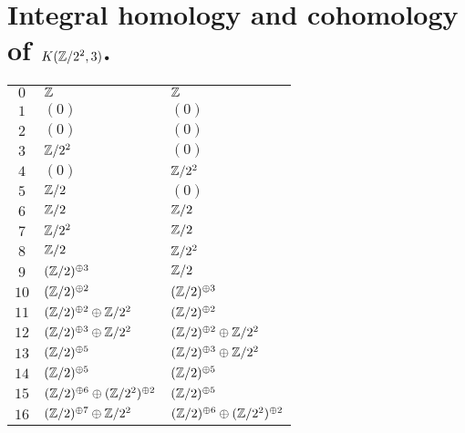\section{Integral homology and cohomology of $K(\mathbb{Z}/2^{2},3)$.}
\tablelasttail{\hline}
\begin{supertabular}{|c|p{5.5cm}|p{5.5cm}|}
$0$%
&$\mathbb{Z}$%
&$\mathbb{Z}$\\

$1$%
&$(0)$%
&$(0)$\\

$2$%
&$(0)$%
&$(0)$\\

$3$%
&$\mathbb{Z}/2^{2}$%
&$(0)$\\

$4$%
&$(0)$%
&$\mathbb{Z}/2^{2}$\\

$5$%
&$\mathbb{Z}/2$%
&$(0)$\\

$6$%
&$\mathbb{Z}/2$%
&$\mathbb{Z}/2$\\

$7$%
&$\mathbb{Z}/2^{2}$%
&$\mathbb{Z}/2$\\

$8$%
&$\mathbb{Z}/2$%
&$\mathbb{Z}/2^{2}$\\

$9$%
&$(\mathbb{Z}/2)^{\oplus3}$%
&$\mathbb{Z}/2$\\

$10$%
&$(\mathbb{Z}/2)^{\oplus2}$%
&$(\mathbb{Z}/2)^{\oplus3}$\\

$11$%
&$(\mathbb{Z}/2)^{\oplus2}\oplus\mathbb{Z}/2^{2}$%
&$(\mathbb{Z}/2)^{\oplus2}$\\

$12$%
&$(\mathbb{Z}/2)^{\oplus3}\oplus\mathbb{Z}/2^{2}$%
&$(\mathbb{Z}/2)^{\oplus2}\oplus\mathbb{Z}/2^{2}$\\

$13$%
&$(\mathbb{Z}/2)^{\oplus5}$%
&$(\mathbb{Z}/2)^{\oplus3}\oplus\mathbb{Z}/2^{2}$\\

$14$%
&$(\mathbb{Z}/2)^{\oplus5}$%
&$(\mathbb{Z}/2)^{\oplus5}$\\

$15$%
&$(\mathbb{Z}/2)^{\oplus6}\oplus(\mathbb{Z}/2^{2})^{\oplus2}$%
&$(\mathbb{Z}/2)^{\oplus5}$\\

$16$%
&$(\mathbb{Z}/2)^{\oplus7}\oplus\mathbb{Z}/2^{2}$%
&$(\mathbb{Z}/2)^{\oplus6}\oplus(\mathbb{Z}/2^{2})^{\oplus2}$\\


\end{supertabular}
